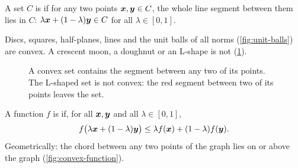\begin{definition}\label{def:convex-set}
A set $C$ is  if for any two points $\bm{x}, \bm{y} \in C$,
the whole line segment between them lies in $C$: $\lambda\bm{x} + (1 - \lambda)\bm{y}
\in C$ for all $\lambda \in [0, 1]$.
\end{definition}

Discs, squares, half-planes, lines and the unit balls of all norms
(\cref{fig:unit-balls}) are convex. A crescent moon, a doughnut or an L-shape is
not (\cref{fig:convex-sets}).

\begin{figure}[htbp]
\centering
{}
\caption{A convex set contains the segment between any two of its points. The
  L-shaped set is not convex: the red segment between two of its points leaves
  the set.}
\label{fig:convex-sets}
\end{figure}

\begin{definition}\label{def:convex-function}
A function $f$ is  if, for all $\bm{x}, \bm{y}$ and all
$\lambda \in [0, 1]$,
\[
  f\bigl(\lambda\bm{x} + (1 - \lambda)\bm{y}\bigr) \le \lambda f(\bm{x}) + (1 - \lambda)f(\bm{y}).
\]
Geometrically: the chord between any two points of the graph lies on or above
the graph (\cref{fig:convex-function}).
\end{definition}


